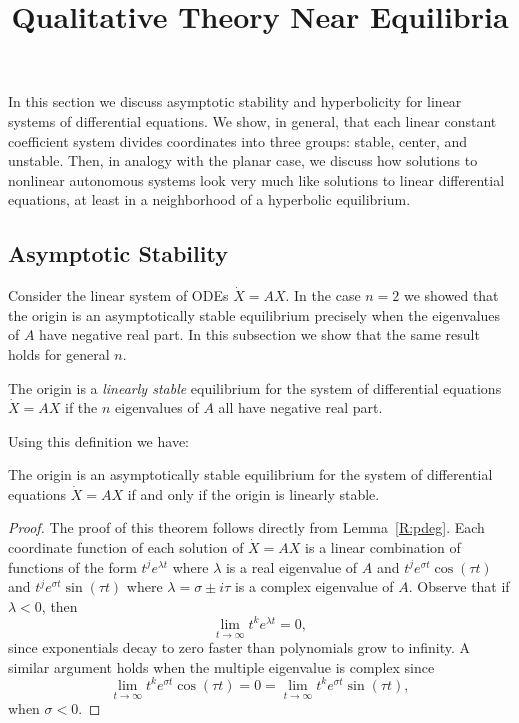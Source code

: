 \documentclass{ximera}
\title{Qualitative Theory Near Equilibria}
\begin{document}
\begin{abstract}
\end{abstract}
\maketitle


\label{S:QT}


In this section we discuss asymptotic stability and hyperbolicity for 
linear systems of differential equations.  We show, in general, that 
each linear constant coefficient system divides coordinates into three
groups: stable, center, and unstable.   Then, in analogy with the 
planar case, we discuss how solutions to nonlinear autonomous systems 
look very much like solutions to linear differential equations, at least
in a neighborhood of a hyperbolic equilibrium.


\subsection*{Asymptotic Stability}


Consider the linear system of ODEs $\dot{X}=AX$.  In the case $n=2$ we showed 
that the origin is an asymptotically stable equilibrium precisely when the 
eigenvalues of $A$ have negative real part.  In this subsection we show that the 
same result holds for general $n$. 
\begin{definition}  \label{D:linstab}
The origin is a {\em linearly stable\/} equilibrium for the system 
of differential equations $\dot{X}=AX$ if the $n$ eigenvalues of $A$ 
all have negative real part.  
\end{definition}
Using this definition we have:
\begin{theorem}  \label{T:linstab}
The origin is an asymptotically stable equilibrium for the system of 
differential equations $\dot{X}=AX$ if and only if the origin is linearly stable.
\end{theorem}

\begin{proof} The proof of this theorem follows directly from Lemma~\ref{R:pdeg}.
Each coordinate function of each solution of $\dot{X}=AX$ is a linear 
combination of functions of the form $t^je^{\lambda t}$ where $\lambda$ is 
a real eigenvalue of $A$ and $t^je^{\sigma t}\cos(\tau t)$ and 
$t^je^{\sigma t}\sin(\tau t)$ where $\lambda=\sigma\pm i\tau$ is a complex
eigenvalue of $A$.  Observe that if $\lambda < 0$, then
\[
\lim_{t\to\infty}t^ke^{\lambda t} = 0,
\]
since exponentials decay to zero faster than 
polynomials grow to infinity.  A similar argument holds when the multiple 
eigenvalue is complex since 
\[
\lim_{t\to\infty}t^ke^{\sigma t}\cos(\tau t) = 0 = 
\lim_{t\to\infty}t^ke^{\sigma t}\sin(\tau t),
\]
when $\sigma < 0$.  \end{proof}
\end{document}
